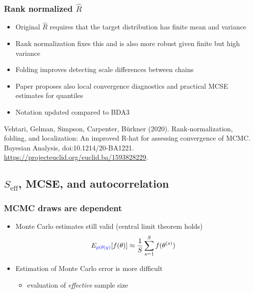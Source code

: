 \documentclass[10pt]{beamer}
\begin{document}
\begin{frame}[fragile]

\frametitle{ Rank normalized $\widehat{R}$}

  \begin{itemize}
  \item<+-> Original $\widehat{R}$ requires that the target distribution
    has finite mean and variance
  \item<+-> Rank normalization fixes this and is also more robust given
    finite but high variance
  \item<+-> Folding improves detecting scale differences between chains
  \item<+-> Paper proposes also local convergence diagnostics and
    practical MCSE estimates for quantiles
  \item<+-> Notation updated compared to BDA3
  \end{itemize}

    Vehtari, Gelman, Simpson, Carpenter, Bürkner
  (2020). Rank-normalization, folding, and localization: An improved
  R-hat for assessing convergence of MCMC. Bayesian Analysis, doi:10.1214/20-BA1221. \url{https://projecteuclid.org/euclid.ba/1593828229}.

\end{frame}

\subsection{$S_\text{eff}$, MCSE, and autocorrelation}


\begin{frame}

\frametitle{ MCMC draws are dependent}

  \begin{itemize}
    \item Monte Carlo estimates still valid (central limit theorem holds)
      \begin{align*}
        E_{\color{blue} p(\theta|y)}[f(\theta)] \approx \frac{1}{S} \sum_{s=1}^S f(\theta^{(s)})
      \end{align*}
    \item Estimation of Monte Carlo error is more difficult
      \begin{itemize}
      \item evaluation of {\it effective} sample size
      \end{itemize}
    \end{itemize}
\end{frame}
\end{document}
